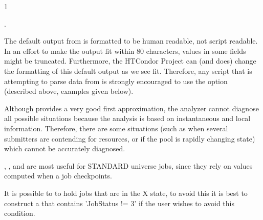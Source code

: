 \begin{ManPage}{\label{man-condor-q}}{1}
\begin{Options}
{    .}
\end{Options}

\GenRem

The default output from  is formatted to be human readable,
not script readable.
In an effort to make the output fit within 80 characters, values in
some fields might be truncated.
Furthermore, the HTCondor Project can (and does) change the formatting
of this default output as we see fit.
Therefore, any script that is attempting to parse data from 
is strongly encouraged to use the  option (described
above, examples given below).

Although  provides a very good first approximation, the analyzer 
cannot diagnose all possible situations because the analysis is based on 
instantaneous and local information.  Therefore, there are some situations 
(such as when several submitters are contending for resources, or if the pool 
is rapidly changing state) which cannot be accurately diagnosed.

, , and  are most useful for STANDARD
universe jobs, since they rely on values computed when a job
checkpoints.

It is possible to to hold jobs that are in the X state, to avoid this it 
is best to construct a  that contains
'JobStatus != 3' if the user wishes to avoid this condition. 

\Examples


\end{ManPage}
